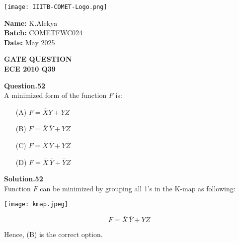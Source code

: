 \documentclass{article}
\begin{document}
\begin{minipage}{0.6\textwidth}
    \texttt{[image: IIITB-COMET-Logo.png]} %
\end{minipage}
\hfill
\begin{minipage}{0.35\textwidth}
\raggedleft
\textbf{Name:} K.Alekya \\
\textbf{Batch:} COMETFWC024 \\
\textbf{Date:} May 2025
\end{minipage}

\begin{center}
    {\color{cyan} \LARGE \textbf{GATE QUESTION}}\\
    {\color{cyan} \Large \textbf{ECE 2010 Q39}}
\end{center}
\vspace{1em}
\noindent\textbf{\color{cyan} Question.52} \\

A minimized form of the function \( F \) is:
\begin{multicols}{2}
\begin{itemize}
  \item[(A)] \( F = \overline{X}Y + YZ \)
  \item[(B)] \( F = \overline{X}\,\overline{Y} + YZ \)
  \item[(C)] \( F = \overline{X}\,\overline{Y} + Y\overline{Z} \)
  \item[(D)] \( F = \overline{X}\,\overline{Y} + \overline{Y}Z \)
\end{itemize}
\end{multicols}

\noindent\textbf{\color{cyan} Solution.52} \\
Function \( F \) can be minimized by grouping all 1’s in the K-map as following:

\begin{center}
\texttt{[image: kmap.jpeg]} %
\end{center}

\[
F = \overline{X}\,\overline{Y} + YZ
\]

Hence, (B) is the correct option.
\end{document}

